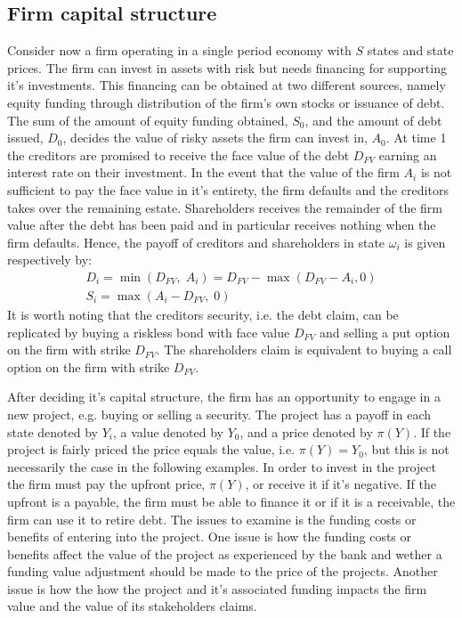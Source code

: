 \documentclass[../main.tex]{subfiles}
\begin{document}
    \subsection{Firm capital structure}
        Consider now a firm operating in a single period economy with $S$ states and state prices. The firm can invest in assets with risk but needs financing for supporting it's investments. This financing can be obtained at two different sources, namely equity funding through distribution of the firm's own stocks or issuance of debt. The sum of the amount of equity funding obtained, $S_{0}$, and the amount of debt issued, $D_{0}$, decides the value of risky assets the firm can invest in, $A_{0}$. At time 1 the creditors are promised to receive the face value of the debt $D_{FV}$ earning an interest rate on their investment. In the event that the value of the firm $A_{i}$ is not sufficient to pay the face value in it's entirety, the firm defaults and the creditors takes over the remaining estate. Shareholders receives the remainder of the firm value after the debt has been paid and in particular receives nothing when the firm defaults. Hence, the payoff of creditors and shareholders in state $\omega_{i}$ is given respectively by:
            \begin{gather}
                D_{i}
                    = \min\left(
                        D_{FV},\; A_{i}
                    \right)
                    = D_{FV} - \max\left(
                        D_{FV} - A_{i}, 0
                    \right) \label{eqn:legacy-creditor-payoff}\\
                S_{i}
                    = \max\left(
                        A_{i} - D_{FV},\; 0
                    \right)
            \end{gather}
        It is worth noting that the creditors security, i.e. the debt claim, can be replicated by buying a riskless bond with face value $D_{FV}$ and selling a put option on the firm with strike $D_{FV}$. The shareholders claim is equivalent to buying a call option on the firm with strike $D_{FV}$.

        After deciding it's capital structure, the firm has an opportunity to engage in a new project, e.g. buying or selling a security. The project has a payoff in each state denoted by $Y_{i}$, a value denoted by $Y_{0}$, and a price denoted by $\pi(Y)$. If the project is fairly priced the price equals the value, i.e. $\pi(Y) = Y_{0}$, but this is not necessarily the case in the following examples. In order to invest in the project the firm must pay the upfront price, $\pi(Y)$, or receive it if it's negative. If the upfront is a payable, the firm must be able to finance it or if it is a receivable, the firm can use it to retire debt. The issues to examine is the funding costs or benefits of entering into the project. One issue is how the funding costs or benefits affect the value of the project as experienced by the bank and wether a funding value adjustment should be made to the price of the projects. Another issue is how the how the project and it's associated funding impacts the firm value and the value of its stakeholders claims.
\end{document}
